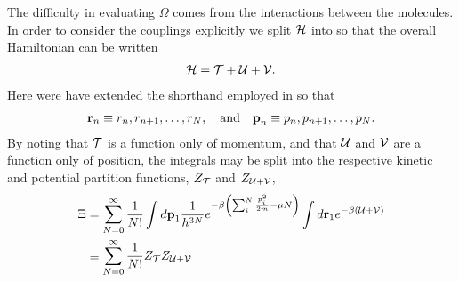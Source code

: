 {The difficulty in evaluating $\Omega$ comes from the interactions between the  molecules.
In order to consider the couplings explicitly we split ${\cal H}$ into 
so that the overall Hamiltonian can be written %
\begin{align}
  \H =  %
\KE + \UE + \VE.
\end{align}
Here were have extended the shorthand  employed in   so that 
\begin{align}
{\mathbf{\textbf{r}}}_n \equiv r_n,r_{n+1},\ldots,r_N,  \quad\text{and}\quad
{\mathbf{\textbf{p}}}_n \equiv  p_n,p_{n+1},\ldots, p_N.
\end{align}
By noting that ${\cal{T}}$ is a function only of momentum, 
and that ${\cal{U}}$ and ${\cal{V}}$ are a function only of position, 
the integrals may be split into the respective kinetic and potential partition functions, $Z_{\cal{T}}$ and $Z_{{\cal{U}}+{\cal{V}}}$,
\begin{align}
  \Xi &=     \sum_{N=0}^\infty\frac{1}{N!}  \int d {\mathbf{\textbf{p}}}_1  \frac{1}{h^{3N}} e^{-\beta \left( \sum_i^N \frac{p_i^2}{2m}-\mu N \right)}  \int d{\mathbf{\textbf{r}}}_1 e^{-\beta({\cal{U}} +{\cal{V}})} \\ 
      &\equiv \sum_{N=0}^\infty\frac{1}{N!} Z_{\cal{T}} Z_{{\cal{U}}+{\cal{V}}}\label{eqn:XiSeparate}
\end{align}
}
